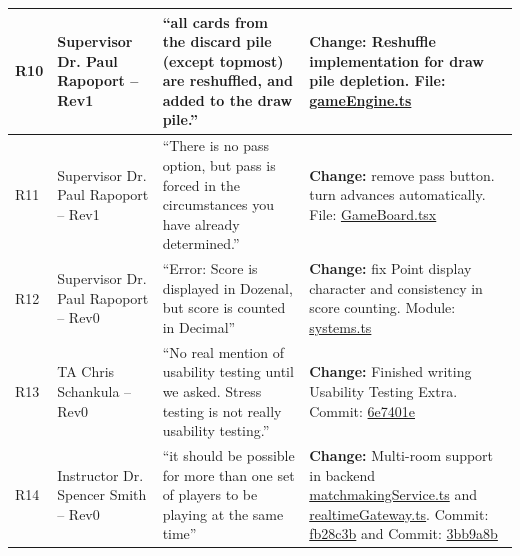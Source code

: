 \documentclass{article}
\begin{document}
\begin{longtable}{p{} p{} p{} p{}}
R10 & Supervisor Dr. Paul Rapoport -- Rev1 & ``all cards from the discard pile (except topmost) are reshuffled, and added to the draw pile.'' & \textbf{Change:} Reshuffle implementation for draw pile depletion. \newline File: \href{https://github.com/The-Crazy-Four-Games/Crazy_1-0s_Game/commits/main/src/rev0/shared/src/gameEngine.ts}{gameEngine.ts} \\
\midrule

R11 & Supervisor Dr. Paul Rapoport -- Rev1 & ``There is no pass option, but pass is forced in the circumstances you have already determined.'' & \textbf{Change:} remove pass button. turn advances automatically. \newline File: \href{https://github.com/The-Crazy-Four-Games/Crazy_1-0s_Game/commits/main/src/rev0/frontend/src/components/GameBoard.tsx}{GameBoard.tsx} \\
\midrule

R12 & Supervisor Dr. Paul Rapoport -- Rev0 & ``Error: Score is displayed in Dozenal, but score is counted in Decimal'' & \textbf{Change:} fix Point display character and consistency in score counting. \newline Module: \href{https://github.com/The-Crazy-Four-Games/Crazy_1-0s_Game/commits/main/src/rev0/shared/src/systems.ts}{systems.ts} \\
\midrule

R13 & TA Chris Schankula -- Rev0 & ``No real mention of usability testing until we asked. Stress testing is not really usability testing.'' & \textbf{Change:} Finished writing Usability Testing Extra. \newline Commit: \href{https://github.com/The-Crazy-Four-Games/Crazy_1-0s_Game/commit/6e7401e76ae8906c76b91a852bb974eef7772355}{6e7401e} \\
\midrule

R14 & Instructor Dr. Spencer Smith -- Rev0 & ``it should be possible for more than one set of players to be playing at the same time'' & \textbf{Change:} Multi-room support in backend \href{https://github.com/The-Crazy-Four-Games/Crazy_1-0s_Game/commits/main/src/rev0/backend/src/modules/matchmaking/matchmakingService.ts}{matchmakingService.ts} and \href{https://github.com/The-Crazy-Four-Games/Crazy_1-0s_Game/commits/main/src/rev0/backend/src/modules/realtime/realtimeGateway.ts}{realtimeGateway.ts}. \newline Commit: \href{https://github.com/The-Crazy-Four-Games/Crazy_1-0s_Game/commit/fb28c3b87b813e39ed40b9ea22af8be98762e0f1}{fb28c3b} and Commit: \href{https://github.com/The-Crazy-Four-Games/Crazy_1-0s_Game/commit/3bb9a8bdc77078b73548373c7f37b51bbb2c6f6f}{3bb9a8b} \\
\midrule


\end{longtable}
\end{document}
